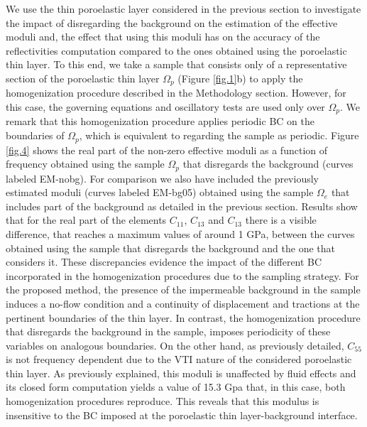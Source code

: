 \documentclass[draft]{agujournal2019}
\begin{document}
We use the thin poroelastic layer considered in the previous section to investigate the impact of disregarding the background on the estimation of the effective moduli and, the effect that using this moduli has on the accuracy of the reflectivities computation compared to the ones obtained using the poroelastic thin layer. To this end, we take a sample that consists only of a representative section of the poroelastic thin layer $\Omega_p$ (Figure \ref{fig.1}b) to apply the homogenization procedure described in the Methodology section. However, for this case, the governing equations and oscillatory tests are used only over $\Omega_p$. We remark that this homogenization procedure applies periodic BC on the boundaries of $\Omega_p$, which is equivalent to regarding the sample as periodic.
Figure \ref{fig.4} shows the real part of the non-zero effective moduli as a function of frequency obtained using the sample $\Omega_p$ that disregards the background (curves labeled EM-nobg). For comparison we also have included the previously estimated moduli (curves labeled EM-bg05) obtained using the sample $\Omega_e$  that includes part of the background as detailed in the previous section. Results show that for the real part of the elements $C_{11}$, $C_{13}$ and $C_{13}$ there is a visible difference, that reaches a maximum values of around 1 GPa, between the curves obtained using the sample that disregards the background and the one that considers it. These discrepancies evidence the impact of the different BC incorporated in the homogenization procedures due to the sampling strategy. For the proposed method, the presence of the impermeable background in the sample induces a no-flow condition and a continuity  of displacement and tractions at the pertinent boundaries of the thin layer. In contrast, the homogenization procedure that disregards the background in the sample, imposes periodicity of these variables on analogous boundaries. On the other hand, as previously detailed, $C_{55}$ is not frequency dependent due to the VTI nature of the considered poroelastic thin layer. As previously explained, this moduli is unaffected by fluid effects and its closed form computation yields a value of 15.3 Gpa that, in this case, both homogenization procedures reproduce. This reveals that this modulus is insensitive to the BC imposed at the poroelastic thin layer-background interface.
\end{document}
